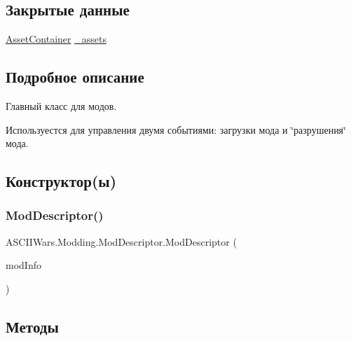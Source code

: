 \subsection*{Закрытые данные}
\begin{DoxyCompactItemize}
\item 
\hyperlink{class_a_s_c_i_i_wars_1_1_game_1_1_asset_container}{Asset\+Container} \hyperlink{class_a_s_c_i_i_wars_1_1_modding_1_1_mod_descriptor_aa566f129182ce06660d9cdcc0c5ac46c}{\+\_\+assets}
\end{DoxyCompactItemize}


\subsection{Подробное описание}
Главный класс для модов. 

Используестся для управления двумя событиями\+: загрузки мода и \char`\"{}разрушения\char`\"{} мода. 

\subsection{Конструктор(ы)}
\hypertarget{class_a_s_c_i_i_wars_1_1_modding_1_1_mod_descriptor_a7a7b93295cc97ebd7fbcdf74763794d7}{}\label{class_a_s_c_i_i_wars_1_1_modding_1_1_mod_descriptor_a7a7b93295cc97ebd7fbcdf74763794d7} 
\subsubsection{\texorpdfstring{Mod\+Descriptor()}{ModDescriptor()}}
{\footnotesize\ttfamily A\+S\+C\+I\+I\+Wars.\+Modding.\+Mod\+Descriptor.\+Mod\+Descriptor (\begin{DoxyParamCaption}\item[{\hyperlink{class_a_s_c_i_i_wars_1_1_modding_1_1_mod_info}{Mod\+Info}}]{mod\+Info }\end{DoxyParamCaption})\hspace{0.3cm}{\ttfamily [inline]}}



\subsection{Методы}
\hypertarget{class_a_s_c_i_i_wars_1_1_modding_1_1_mod_descriptor_ab46b22497373a1bc6aab9e24f890088f}{}\label{class_a_s_c_i_i_wars_1_1_modding_1_1_mod_descriptor_ab46b22497373a1bc6aab9e24f890088f} 
